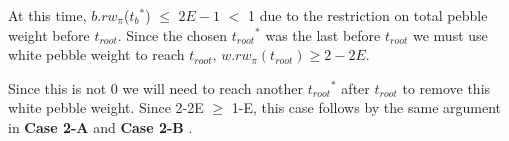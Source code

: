 \documentclass[12pt]{article}
\newenvironment{proofL}{\hspace{.4em}}
                      {\hspace{\fill}{$\blacksquare$} \smallskip}
\newcommand{\troot}{t_{root}}
\newcommand{\troots}{{t_{root}}^*}
\newcommand{\tbss}{{t_b}^{**}}
\newcommand{\tbs}{{t_b}^{*}}
\newcommand{\trootsFirst}{{t_{root}}^{*First}}
\begin{document}
\begin{proofL}
At this time, $b.rw_{\pi}$($\tbs$) $\leq$ $2E-1$ $<$ 1 due to the restriction on total pebble weight before $\troot$. Since the chosen $\troots$ was the last before $\troot$ we must use white pebble weight to reach $\troot$, $w.rw_{\pi}(\troot) \geq 2-2E$.

Since this is not 0 we will need to reach another $\troots$ after $\troot$ to remove this white pebble weight. Since 2-2E $\geq$ 1-E, this case follows by the same argument in {\bf Case 2-A} and {\bf Case 2-B} .\\









\end{proofL}
\end{document}
